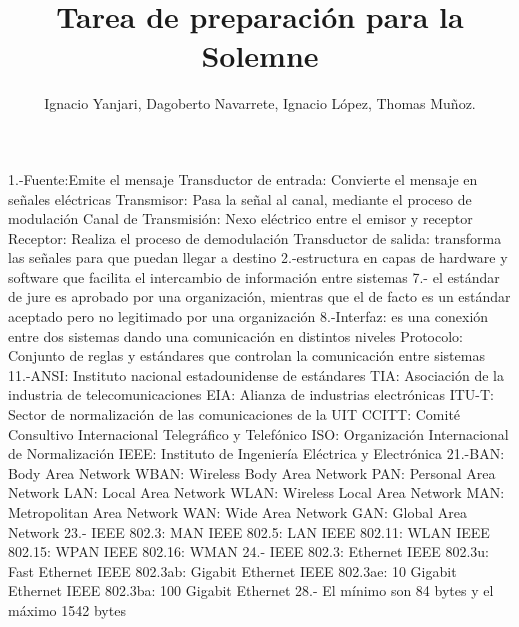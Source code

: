 \documentclass{udparticle}
\title{Tarea de preparación para la Solemne}
\author{Ignacio Yanjari, Dagoberto Navarrete, Ignacio López, Thomas Muñoz.}
\begin{document}
\maketitle
\begin{enumerate}
1.-Fuente:Emite el mensaje
Transductor de entrada: Convierte el mensaje en señales eléctricas
Transmisor: Pasa la señal al canal, mediante el proceso de modulación
Canal de Transmisión: Nexo eléctrico entre el emisor y receptor
Receptor: Realiza el proceso de demodulación 
Transductor de salida: transforma las señales para que puedan llegar a destino
2.-estructura en capas de hardware y software que facilita el intercambio de información entre sistemas
7.- el estándar de jure es aprobado por una organización, mientras que el de facto es un estándar aceptado pero no legitimado por una organización
8.-Interfaz: es una conexión entre dos sistemas dando una comunicación en distintos niveles
Protocolo: Conjunto de reglas y estándares que controlan la comunicación entre sistemas
11.-ANSI: Instituto nacional estadounidense de estándares
TIA: Asociación de la industria de telecomunicaciones
EIA: Alianza de industrias electrónicas
ITU-T: Sector de normalización de las comunicaciones de la UIT
CCITT: Comité Consultivo Internacional Telegráfico y Telefónico
ISO: Organización Internacional de Normalización
IEEE: Instituto de Ingeniería Eléctrica y Electrónica
21.-BAN: Body Area Network
WBAN: Wireless Body Area Network
PAN: Personal Area Network
LAN: Local Area Network
WLAN: Wireless Local Area Network
MAN: Metropolitan Area Network
WAN: Wide Area Network
GAN: Global Area Network
23.- IEEE 802.3: MAN
IEEE 802.5: LAN
IEEE 802.11: WLAN
IEEE 802.15: WPAN
IEEE 802.16: WMAN
24.- IEEE 802.3: Ethernet
IEEE   802.3u: Fast Ethernet
IEEE  802.3ab: Gigabit Ethernet
IEEE 802.3ae: 10 Gigabit Ethernet
IEEE 802.3ba: 100 Gigabit Ethernet
28.- El mínimo son 84 bytes y el máximo 1542 bytes

\end{enumerate}
\end{document}
